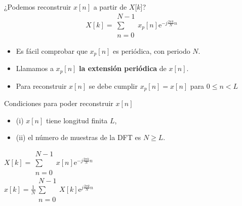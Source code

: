 \documentclass{beamer}
\numberwithin{section}{part}
\begin{document}
\begin{frame}
  \alert {¿Podemos reconstruir $x[n]$ a partir de $X[k$]?}
  \[X[k]=\substack{N-1\\\sum\\n=0}x_p[n]\text{e}^{-j\frac{2\pi k}{N} n }\]
  \begin{itemize}
    \item Es fácil comprobar que $x_p[n]$ es periódica, con periodo $N$.
    \item Llamamos a $x_p[n]$ \textbf{la extensión periódica} de $x[n]$.
    \item Para reconstruir $x[n]$ se debe cumplir $x_p[n]=x[n]$ para $0\leq n<L$
  \end{itemize}

  \begin{alertblock}{Condiciones para poder reconstruir $x[n]$}
    \begin{itemize}
      \item (i) $x[n]$ tiene longitud finita $L$,
      \item (ii) el número de muestras de la DFT es $N\geq L$.
    \end{itemize}
    \begin{center}
      $X[k]=\substack{N-1\\\sum\\n=0}x[n]\text{e}^{-j\frac{2\pi k}{N} n}$\\
      $x[k]=\frac{1}{N}\substack{N-1\\\sum\\n=0}X[k]\text{e}^{j\frac{2\pi k}{N} n}$
    \end{center}
  \end{alertblock}
\end{frame}


\end{document}
